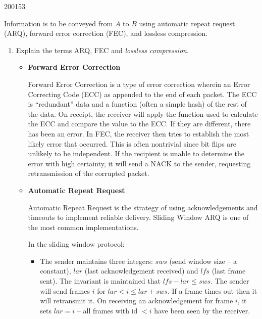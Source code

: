 \documentclass[10pt,\jkfside,a4paper]{article}
\begin{document}
\begin{examquestion}{2001}{5}{3}

Information is to be conveyed from $A$ to $B$ using automatic repeat request
(ARQ), forward error correction (FEC), and lossless compression.

\begin{enumerate}

\item Explain the terms ARQ, FEC and \textit{lossless compression}.

\begin{itemize}

\item

\textbf{Forward Error Correction}

Forward Error Correction is a type of error correction wherein an Error
Correcting Code (ECC) as appended to the end of each packet. The ECC is
``redundant'' data and a function (often a simple hash) of the rest of the
data. On receipt, the receiver will apply the function used to calculate
the ECC and compare the value to the ECC. If they are different, there has
been an error. In FEC, the receiver then tries to establish the most likely
error that occurred. This is often nontrivial since bit flips are unlikely
to be independent. If the recipient is unable to determine the error with high
certainty, it will send a NACK to the sender, requesting retransmission of
the corrupted packet.

\item

\textbf{Automatic Repeat Request}

Automatic Repeat Request is the strategy of using acknowledgements and
timeouts to implement reliable delivery. Sliding Window ARQ is one of the
most common implementations.

In the sliding window protocol:

\begin{itemize}

\item The sender maintains three integers: $sws$ (send window size -- a
constant), $lar$ (last acknowledgement received) and $lfs$ (last frame
sent). The invariant is maintained that $lfs - lar \leq sws$. The sender
will send frames $i$ for $lar < i \leq lar + sws$. If a frame times out
then it will retransmit it. On receiving an acknowledgement for frame $i$,
it sets $lar = i$ -- all frames with id $< i$ have been seen by the receiver.


\end{itemize}
\end{itemize}
\end{enumerate}
\end{examquestion}
\end{document}
